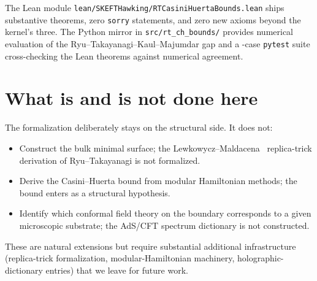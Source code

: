 \documentclass[twocolumn]{revtex4-2}
\begin{document}
The Lean module
\texttt{lean/SKEFTHawking/RTCasiniHuertaBounds.lean} ships \rtChThms{}
substantive theorems, zero \texttt{sorry} statements, and zero new
axioms beyond the kernel's three. The Python mirror in
\texttt{src/rt\_ch\_bounds/} provides numerical evaluation of the
Ryu--Takayanagi--Kaul--Majumdar gap and a \rtChTests{}-case \texttt{pytest}
suite cross-checking the Lean theorems against numerical agreement.

\section{What is and is not done here}
\label{sec:scope}

The formalization deliberately stays on the structural side. It does
not:

\begin{itemize}
\item Construct the bulk minimal surface; the
Lewkowycz--Maldacena~\cite{LewkowyczMaldacena2013} replica-trick
derivation of Ryu--Takayanagi is not formalized.
\item Derive the Casini--Huerta bound from modular Hamiltonian
methods; the bound enters as a structural hypothesis.
\item Identify which conformal field theory on the boundary
corresponds to a given microscopic substrate; the AdS/CFT spectrum
dictionary is not constructed.
\end{itemize}

These are natural extensions but require substantial additional
infrastructure (replica-trick formalization, modular-Hamiltonian
machinery, holographic-dictionary entries) that we leave for future
work.
\end{document}
